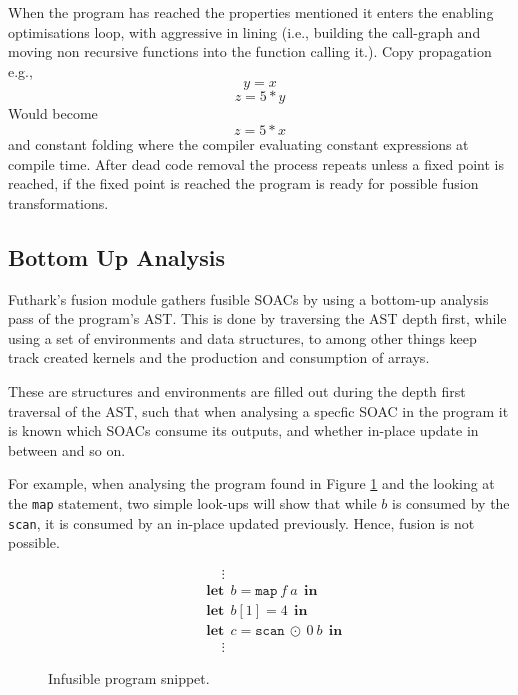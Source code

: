 \documentclass[11pt]{article}
\newcommand\lett{\phantom{-}\:\:\mathbf{let}\:\:}
\newcommand\inn{\:\:\mathbf{in}\:\:}
\begin{document}
When the program has reached the properties mentioned it enters the enabling optimisations loop, with aggressive in lining (i.e., building the call-graph and moving non recursive functions into the function calling it.). Copy propagation e.g., 
$$y = x $$
$$z = 5 * y $$
Would become
$$z = 5 * x $$
and constant folding where the compiler evaluating constant expressions at compile time. After dead code removal the process repeats unless a fixed point is reached, if the fixed point is reached the program is ready for possible fusion transformations.

\subsection{Bottom Up Analysis}
Futhark's fusion module gathers fusible SOACs by using a bottom-up analysis pass of the program's AST. This is done by traversing the AST depth first, while using a set
 of environments and data structures, to among other things keep track created kernels and the production and consumption of arrays. \cite{T2Fusion}

These are structures and environments are filled out during the depth first traversal of the AST, such that when analysing a specfic SOAC in the program it is known which
 SOACs consume its outputs, and whether in-place update in between and so on.

For example, when analysing the program found in Figure \ref{fig:progsnip1} and the looking at the \texttt{map} statement, two simple look-ups will show that while $b$ is consumed by the
 \texttt{scan}, it is consumed by an in-place updated previously. Hence, fusion is not possible.
\begin{figure}[hb!]
  \centering
  \begin{mdframed}[style=alignbox]
  \begin{align*}
    &\phantom{---}\vdots\\
    &\lett b = \mathtt{map} \: f \: a \inn\\
    &\lett b[1] = 4 \inn\\
    &\lett c = \mathtt{scan} \: \odot \: 0 \: b \inn\\
    &\phantom{---}\vdots
  \end{align*}
\end{mdframed}

  \caption{Infusible program snippet.}
  \label{fig:progsnip1}
\end{figure}
\end{document}

